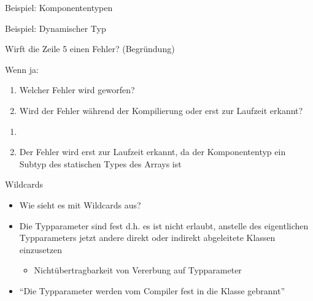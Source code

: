 \documentclass{../tuda-beamer}
\begin{document}
    \begin{frame}[c]{Beispiel: Komponententypen}
        
    \end{frame}

    \begin{frame}[c]{Beispiel: Dynamischer Typ}
        
    \end{frame}

    \begin{frame}
        Wirft die Zeile 5 einen Fehler? (Begründung)

        Wenn ja:

        \begin{enumerate}
            \item Welcher Fehler wird geworfen?
            \item Wird der Fehler während der Kompilierung oder erst zur Laufzeit erkannt?
        \end{enumerate}

        

        \pause

        \begin{enumerate}
            \item {}
            \item Der Fehler wird erst zur Laufzeit erkannt, da der Komponententyp ein Subtyp des
            statischen Types des Arrays ist
        \end{enumerate}
    \end{frame}

    \begin{frame}[c]{Wildcards}
        \begin{itemize}
            \item Wie sieht es mit Wildcards aus?
            \item Die Typparameter sind fest d.h. es ist nicht erlaubt, anstelle des eigentlichen
            Typparameters jetzt andere direkt oder indirekt abgeleitete Klassen einzusetzen
            \begin{itemize}
                \item Nichtübertragbarkeit von Vererbung auf Typparameter
            \end{itemize}
            \item \enquote{Die Typparameter werden vom Compiler fest in die Klasse gebrannt}
        \end{itemize}
    \end{frame}
\end{document}

